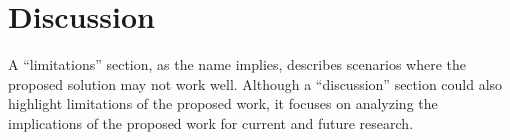 \section{Discussion}\label{s:discussion}

A “limitations” section, as the name implies, describes scenarios where the
proposed solution may not work well. Although a “discussion” section could also
highlight limitations of the proposed work, it focuses on analyzing the
implications of the proposed work for current and future research.



